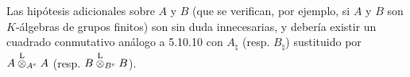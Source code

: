 Las hipótesis adicionales sobre $A$ y $B$ (que se verifican, por ejemplo, si $A$ y $B$ son $K$-álgebras de grupos finitos) son sin duda innecesarias, y debería existir un cuadrado conmutativo análogo a 5.10.10 con $A_\natural$ (resp. $B_\natural$) sustituido por $A\overset{\mathrm L}{\otimes}_{A^e}A$ (resp. $B\overset{\mathrm L}{\otimes}_{B^e}B$).
